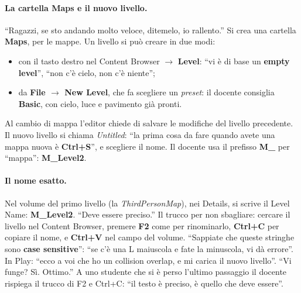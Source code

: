 \paragraph{La cartella Maps e il nuovo livello.} ``Ragazzi, se sto andando molto veloce,
ditemelo, io rallento.'' Si crea una cartella \textbf{Maps}, per le mappe. Un livello
si può creare in due modi:
\begin{itemize}
  \item con il tasto destro nel Content Browser $\rightarrow$ \textbf{Level}: ``vi è di
        base un \textbf{empty level}'', ``non c'è cielo, non c'è niente'';
  \item da \textbf{File $\rightarrow$ New Level}, che fa scegliere un \emph{preset}: il
        docente consiglia \textbf{Basic}, con cielo, luce e pavimento già pronti.
\end{itemize}
Al cambio di mappa l'editor chiede di salvare le modifiche del livello precedente. Il
nuovo livello si chiama \emph{Untitled}: ``la prima cosa da fare quando avete una mappa
nuova è \textbf{Ctrl+S}'', e scegliere il nome. Il docente usa il prefisso
\textbf{M\_} per ``mappa'': \textbf{M\_Level2}.

\paragraph{Il nome esatto.} Nel volume del primo livello (la \emph{ThirdPersonMap}), nei
Details, si scrive il Level Name: \textbf{M\_Level2}. ``Deve essere preciso.'' Il trucco
per non sbagliare: cercare il livello nel Content Browser, premere \textbf{F2} come per
rinominarlo, \textbf{Ctrl+C} per copiare il nome, e \textbf{Ctrl+V} nel campo del volume.
``Sappiate che queste stringhe sono \textbf{case sensitive}'': ``se c'è una L maiuscola e
fate la minuscola, vi dà errore''. In Play: ``ecco a voi che ho un collision overlap, e
mi carica il nuovo livello''. ``Vi funge? Sì. Ottimo.'' A uno studente che si è perso
l'ultimo passaggio il docente rispiega il trucco di F2 e Ctrl+C: ``il testo è preciso,
è quello che deve essere''.


